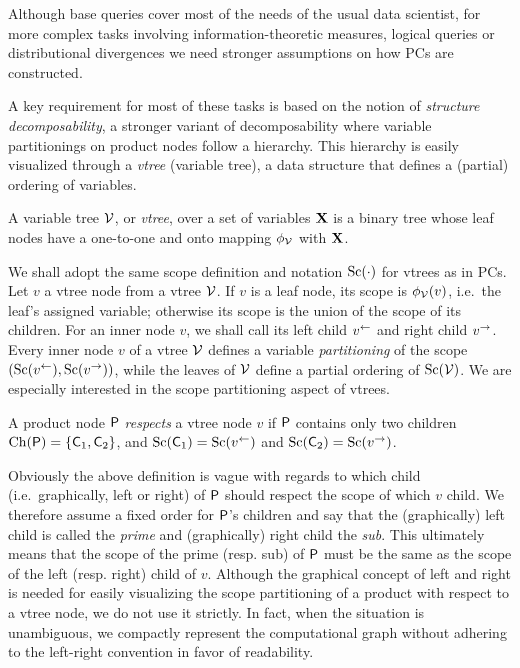 Although base queries cover most of the needs of the usual data scientist, for more complex tasks
involving information-theoretic measures, logical queries or distributional divergences we need
stronger assumptions on how PCs are constructed.

A key requirement for most of these tasks is based on the notion of \emph{structure
decomposability}, a stronger variant of decomposability where variable partitionings on product
nodes follow a hierarchy. This hierarchy is easily visualized through a \emph{vtree} (variable
tree), a data structure that defines a (partial) ordering of variables.

\begin{definition}[Vtree]
  A variable tree $\operatorname{\mathcal{V}}$, or \emph{vtree}, over a set of variables $\mathbf{X}$ is a binary tree
  whose leaf nodes have a one-to-one and onto mapping $\phi_{\operatorname{\mathcal{V}}}$ with $\mathbf{X}$.
\end{definition}

We shall adopt the same scope definition and notation $\operatorname*{\normalfont{Sc}}(\cdot)$ for vtrees as in PCs. Let $v$ a
vtree node from a vtree $\operatorname{\mathcal{V}}$. If $v$ is a leaf node, its scope is $\phi_{\operatorname{\mathcal{V}}}(v)$, i.e.\ the
leaf's assigned variable; otherwise its scope is the union of the scope of its children. For an
inner node $v$, we shall call its left child $v^\gets$ and right child $v^\to$. Every inner node
$v$ of a vtree $\operatorname{\mathcal{V}}$ defines a variable \emph{partitioning} of the scope $(\operatorname*{\normalfont{Sc}}(v^\gets),
\operatorname*{\normalfont{Sc}}(v^\to))$, while the leaves of $\operatorname{\mathcal{V}}$ define a partial ordering of $\operatorname*{\normalfont{Sc}}(\operatorname{\mathcal{V}})$. We are
especially interested in the scope partitioning aspect of vtrees.

\begin{definition}
  A product node $\operatorname{\textsf{P}}$ \emph{respects} a vtree node $v$ if $\operatorname{\textsf{P}}$ contains only two children
  $\operatorname*{\normalfont{Ch}}(\operatorname{\textsf{P}})=\{\operatorname{\textsf{C}}_1,\operatorname{\textsf{C}}_2\}$, and $\operatorname*{\normalfont{Sc}}(\operatorname{\textsf{C}}_1)=\operatorname*{\normalfont{Sc}}(v^\gets)$ and $\operatorname*{\normalfont{Sc}}(\operatorname{\textsf{C}}_2)=
  \operatorname*{\normalfont{Sc}}(v^\to)$.
\end{definition}

Obviously the above definition is vague with regards to which child (i.e.\ graphically, left or
right) of $\operatorname{\textsf{P}}$ should respect the scope of which $v$ child. We therefore assume a fixed order
for $\operatorname{\textsf{P}}$'s children and say that the (graphically) left child is called the \emph{prime} and
(graphically) right child the \emph{sub}. This ultimately means that the scope of the prime (resp.
sub) of $\operatorname{\textsf{P}}$ must be the same as the scope of the left (resp. right) child of $v$. Although the
graphical concept of left and right is needed for easily visualizing the scope partitioning of a
product with respect to a vtree node, we do not use it strictly. In fact, when the situation is
unambiguous, we compactly represent the computational graph without adhering to the left-right
convention in favor of readability.


